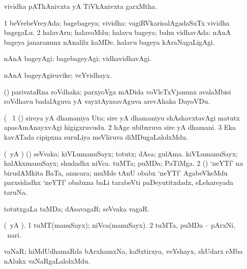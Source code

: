 \bentry
{} 
\gl{\nA}
\expl{}
\bmng
 vividha pAThAnivxta yA TiVkAnivxta garxMtha. 
\emng
\eentry

\bentry
{} 
\gl{\gu}
\expl{}
\bmng
\bnum
\num{1} beVrebeVreyAda; bagebageya; vividha:  vagiRVkarisalAgadaSuTx vividha bagegaLu. 
\num{2} halavAru; halavoMdu; halavu bageya; bahu vidhavAda:  nAnA bageya janaranunx nAnalilx kaMDe.  halavu bageya kAraNagaLigAgi. 
\enum
\emng
\eentry

\bentry
{} 
\gl{\kirxvi}
\expl{}
\bmng
 nAnA bageyAgi; bagebageyAgi; vidhavidhavAgi. 
\emng
\eentry

\bentry
{} 
\gl{\nA}
\expl{}
\bmng
 nAnA bageyAgiruvike; veYvidhayx. 
\emng
\eentry

\bentry
{} 
\gl{\nA}
\expl{}
\bmng
 (\viduyx) parivataRna roVdhaka; parxyoVga mADida voVleTxVjanunx avalaMbisi roVdhavu badalAguva yA vayxtAyxsavAguva arevAhaka DayoVDu. 
\emng
\eentry

\bentry
{} 
\gl{\nA}(\bava\ 
\bmng
\bnum
\num{1} (\veYshA) sireya yA dhamaniya Uta; sire yA dhamaniyu shAshavxtavAgi matutx apasAmAnayxvAgi higigxruvudu. 
\num{2} hAge ubibxruva sire yA dhamani. 
\num{3} Eka kavATada cipipxna suruLiya meVliruva diMDugaLalolxMdu. 
\enum
\emng
\eentry

\bentry
{} 
\gl{\nA}
\bmng
\bnum
{} (\pArxparx\ yA \hA) 
\banum
{} (\hiV) seVvaka; kiVLumanuSayx; totutx; dAsa; gulAma. 
 kiVLumanuSayx; halAkxmanuSayx; shudadhx niVca. 
 tuMTa; puMDa; PaTiMga. 
\eanum
\numie
\num{2} (\ca) `neYTf' na birudAMkita BaTa, anucara; muMde tAnU obabx `neYTf' AgabeVkeMdu parxsidadhx `neYTf' obabxna baLi tarabeVti paDeyutitxdadx, eLehareyada taruNa. 
\enum
\emng
\eentry

\bentry
{} 
\gl{\nA}
\expl{}
\bmng
 totutxgaLa taMDa; dAsavagaR; seVvaka vagaR. 
\emng
\eentry

\bentry
{} 
\gl{\nA}
\expl{}
\bmng
 (\pArxM\ yA \ame). 
\bnum
\num{1} tuMT(manuSayx); niVca(manuSayx). 
\num{2} tuMTa, puMDa -- pArxNi, \kanmu\ nari. 
\enum
\emng
\eentry

\bentry
{} 
\gl{\nA}
\expl{}
\bmng
 vaNaR; hiMdUdhamaRda bArxhamxNa, kaSxtirxya, veYshayx, shUdarx eMba nAlukx vaNaRgaLalolxMdu. 
\emng
\eentry

